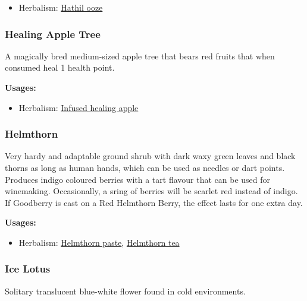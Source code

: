 \begin{itemize}[noitemsep]
\item[] Herbalism: \hyperref[Hathil ooze]{Hathil ooze}
\end{itemize}

\subsubsection{Healing Apple Tree}
\label{Healing Apple Tree}

A magically bred medium-sized apple tree that bears red fruits that when consumed heal 1 health point.

\vspace{5mm}

\textbf{Usages:}

\begin{itemize}[noitemsep]
\item[] Herbalism: \hyperref[Infused healing apple]{Infused healing apple}
\end{itemize}

\subsubsection{Helmthorn}
\label{Helmthorn}

Very hardy and adaptable ground shrub with dark waxy green leaves and black thorns as long as human hands, which can be used as needles or dart points. Produces indigo coloured berries with a tart flavour that can be used for winemaking. Occasionally, a sring of berries will be scarlet red instead of indigo. If Goodberry is cast on a Red Helmthorn Berry, the effect lasts for one extra day.

\vspace{5mm}

\textbf{Usages:}

\begin{itemize}[noitemsep]
\item[] Herbalism: \hyperref[Helmthorn paste]{Helmthorn paste}, \hyperref[Helmthorn tea]{Helmthorn tea}
\end{itemize}

\subsubsection{Ice Lotus}
\label{Ice Lotus}

Solitary translucent blue-white flower found in cold environments.

\vspace{5mm}


